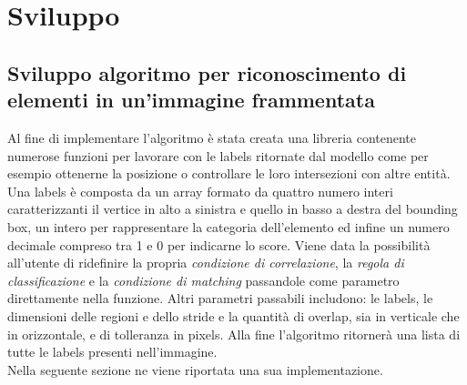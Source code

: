 \section{Sviluppo}
\subsection{Sviluppo algoritmo per riconoscimento di elementi in un'immagine frammentata}
Al fine di implementare l'algoritmo è stata creata una libreria contenente numerose funzioni per lavorare con le labels ritornate dal modello come per esempio ottenerne la posizione o controllare le loro intersezioni con altre entità. Una labels è composta da un array formato da quattro numero interi caratterizzanti il vertice in alto a sinistra e quello in basso a destra del bounding box, un intero per rappresentare la categoria dell'elemento ed infine un numero decimale compreso tra 1 e 0 per indicarne lo score.
Viene data la possibilità all'utente di ridefinire la propria \textit{condizione di correlazione}, la \textit{regola di classificazione} e la \textit{condizione di matching} passandole come parametro direttamente nella funzione. Altri parametri passabili includono: le labels, le dimensioni delle regioni e dello stride e la quantità di overlap, sia in verticale che in orizzontale, e di tolleranza in pixels.
Alla fine l'algoritmo ritornerà una lista di tutte le labels presenti nell'immagine.\\ Nella seguente sezione ne viene riportata una sua implementazione.
